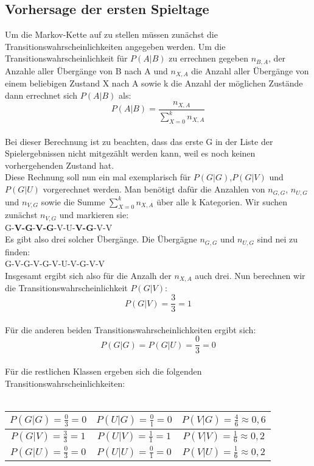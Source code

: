 \documentclass[a4paper]{article}
\begin{document}
\subsection{Vorhersage der ersten Spieltage}
Um die Markov-Kette auf zu stellen müssen zunächst die Transitionswahrscheinlichkeiten angegeben werden. Um die Transitionswahrscheinlichkeit für $P(A|B)$ zu errechnen gegeben $n_{B,A}$, der Anzahle aller Übergänge von B nach A und $n_{X,A}$ die Anzahl aller Übergänge von einem beliebigen Zustand X nach A sowie k die Anzahl der möglichen Zustände dann errechnet sich $P(A|B)$ als: \\
\[ P(A|B)= \frac{n_{X,A}}{\sum_{X=0}^k n_{X,A}} \] \\
Bei dieser Berechnung ist zu beachten, dass das erste G in der Liste der Spielergebnissen nicht mitgezählt werden kann, weil es noch keinen vorhergehenden Zustand hat.\\
Diese Rechnung soll nun ein mal exemplarisch für $P(G|G)$,$P(G|V)$ und $P(G|U)$ vorgerechnet werden. Man benötigt dafür die Anzahlen von $n_{G,G}$, $n_{U,G}$ und $n_{V,G}$ sowie die Summe $\sum_{X=0}^k n_{X,A}$ über alle k Kategorien. Wir suchen zunächst $n_{V,G}$ und markieren sie: \\
G-\textbf{V-G}-\textbf{V-G}-V-U-\textbf{V-G}-V-V\\
Es gibt also drei solcher Übergänge. Die Übergägne $n_{G,G}$ und $n_{U,G}$ sind nei zu finden:\\
G-V-G-V-G-V-U-V-G-V-V\\
Insgesamt ergibt sich also für die Anzalh der $n_{X,A}$ auch drei. Nun berechnen wir die Transitionswahrscheinlichkeit $P(G|V)$:
\[P(G|V)= \frac 3 3 = 1  \]\\
Für die anderen beiden Transitionswahrscheinlichkeiten ergibt sich:\\
 \[P(G|G)=P(G|U)= \frac 0 3 = 0  \]\\
Für die restlichen Klassen ergeben sich die folgenden Transitionswahrscheinlichkeiten:\\
\\
\begin{tabular}{|c|c|c|}
\hline
$P(G|G)=\frac{0}{3}=0$ & $P(U|G)=\frac{0}{1}=0$ & $P(V|G)=\frac{4}{6}\approx 0,6$ \\\hline
$P(G|V)=\frac{3}{3}=1$ & $P(U|V)=\frac{1}{1}=1$ & $P(V|V)=\frac{1}{6}\approx 0,2$\\\hline
$P(G|U)=\frac{0}{3}=0$ & $P(U|U)=\frac{0}{1}=0$ & $P(V|U)=\frac{1}{6}\approx 0,2$\\\hline
\end{tabular}
\end{document}
